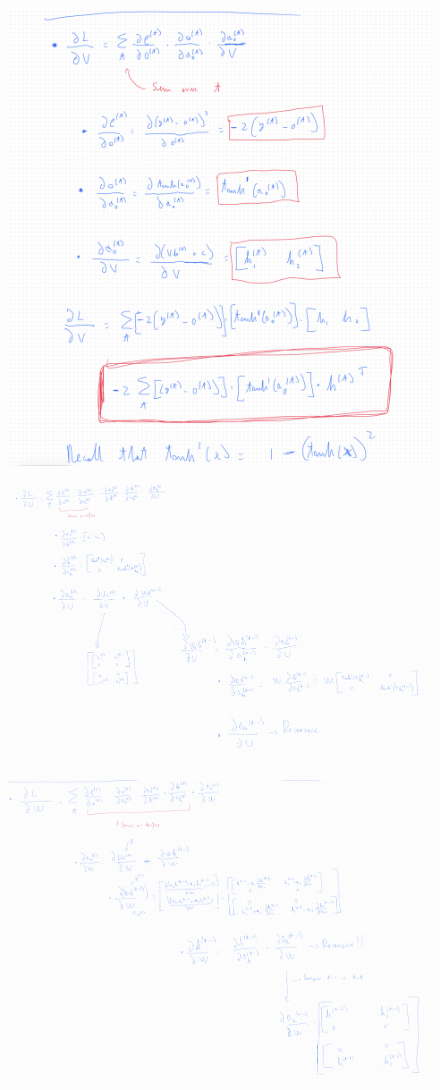 \begin{figure}
    \centering
    \includegraphics[scale=0.2]{images/bptt_2.jpg}
    \label{fig:enter-label}
\end{figure}
\begin{figure}
    \centering
    \includegraphics[scale=0.3]{images/bptt_3.jpg}
    \label{fig:enter-label}
\end{figure}
\begin{figure}
    \centering
    \includegraphics[scale=0.3]{images/bptt4.jpg}
    \label{fig:enter-label}
\end{figure}